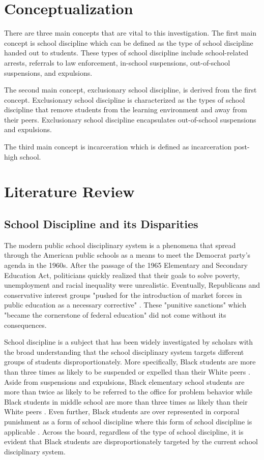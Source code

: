 \documentclass[12pt]{article}
\begin{document}
\section*{Conceptualization}
There are three main concepts that are vital to this investigation. The first main concept is school discipline which can be defined as the type of school discipline handed out to students. These types of school discipline include school-related arrests, referrals to law enforcement, in-school suspensions, out-of-school suspensions, and expulsions. 

The second main concept, exclusionary school discipline, is derived from the first concept. Exclusionary school discipline is characterized as the types of school discipline that remove students from the learning environment and away from their peers. Exclusionary school discipline encapsulates out-of-school suspensions and expulsions. 

The third main concept is incarceration which is defined as incarceration post-high school.



\section*{Literature Review}
\subsection*{School Discipline and its Disparities}
The modern public school disciplinary system is a phenomena that spread through the American public schools as a means to meet the Democrat party's agenda in the 1960s. After the passage of the 1965 Elementary and Secondary Education Act, politicians quickly realized that their goals to solve poverty, unemployment and racial inequality were unrealistic. Eventually, Republicans and conservative interest groups "pushed for the introduction of market forces in public education as a necessary corrective" \cite{Moak2016}. These "punitive sanctions" which "became the cornerstone of federal education" did not come without its consequences. 

School discipline is a subject that has been widely investigated by scholars with the broad understanding that the school disciplinary system targets different groups of students disproportionately. More specifically, Black students are more than three times as likely to be suspended or expelled than their White peers \cite{Okonofua2015}. Aside from suspensions and expulsions, Black elementary school students are more than twice as likely to be referred to the office for problem behavior while Black students in middle school are more than three times as likely than their White peers \cite{Skiba2011}. Even further, Black students are over represented in corporal punishment as a form of school discipline where this form of school discipline is applicable \cite{Skiba2002}. Across the board, regardless of the type of school discipline, it is evident that Black students are disproportionately targeted by the current school disciplinary system. 
\end{document}
